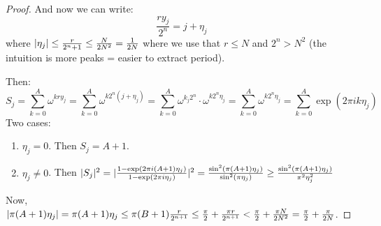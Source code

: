 \begin{proof}
    And now we can write:
    \begin{equation}
        \frac{ry_j}{2^n} = j + \eta_j
    \end{equation}
    where $\lvert \eta_j \rvert \leq \frac{r}{2^n+1} \leq \frac{N}{2N^2} = \frac{1}{2N}$ where we use that $r \leq N$ and $2^n > N^2$ (the intuition is more peaks = easier to extract period).

    Then:
    \begin{equation}
        S_j = \sum_{k=0}^A \omega^{kry_j} = \sum_{k=0}^A \omega^{k 2^n(j + \eta_j)} = \sum_{k=0}^A\omega^{k_j 2^n} \cdot \omega^{k 2^n \eta_j} = \sum_{k=0}^A \omega^{k 2^n \eta_j} = \sum_{k=0}^A \exp(2\pi i k \eta_j)
    \end{equation}
    Two cases:
    \begin{enumerate}
        \item $\eta_j = 0$. Then $S_j = A + 1$. 
        \item $\eta_j \neq 0$. Then $\lvert S_j \rvert^2 = \lvert\frac{1 - \exp(2\pi i (A+1)\eta_j)}{1 - \exp(2\pi i \eta_j)}\rvert^2 = \frac{\sin^2(\pi (A+1)\eta_j)}{\sin^2(\pi \eta_j)} \geq \frac{\sin^2(\pi (A+1)\eta_j)}{\pi^2\eta_j^2}$
    \end{enumerate}
    Now, $\lvert \pi(A+1)\eta_j \rvert = \pi(A+1)\eta_j \leq \pi(B+1)\frac{r}{2^{n+1}} \leq \frac{\pi}{2} + \frac{\pi r}{2^{n+1}} < \frac{\pi}{2} + \frac{\pi N}{2N^2} = \frac{\pi}{2} + \frac{\pi}{2N}$.


\end{proof}
